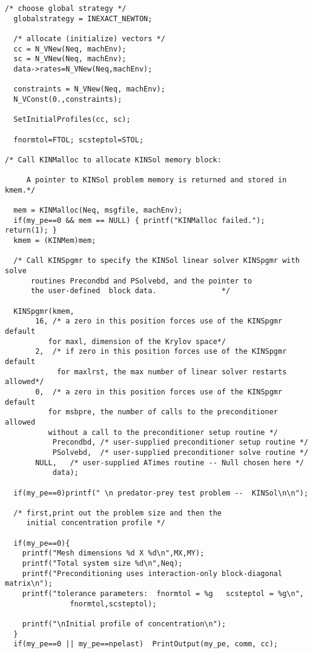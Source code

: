 \begin{verbatim}
/* choose global strategy */
  globalstrategy = INEXACT_NEWTON;

  /* allocate (initialize) vectors */
  cc = N_VNew(Neq, machEnv);
  sc = N_VNew(Neq, machEnv);
  data->rates=N_VNew(Neq,machEnv);

  constraints = N_VNew(Neq, machEnv);
  N_VConst(0.,constraints);
  
  SetInitialProfiles(cc, sc);

  fnormtol=FTOL; scsteptol=STOL;

/* Call KINMalloc to allocate KINSol memory block: 

     A pointer to KINSol problem memory is returned and stored in kmem.*/

  mem = KINMalloc(Neq, msgfile, machEnv);
  if(my_pe==0 && mem == NULL) { printf("KINMalloc failed."); return(1); }
  kmem = (KINMem)mem;

  /* Call KINSpgmr to specify the KINSol linear solver KINSpgmr with solve 
      routines Precondbd and PSolvebd, and the pointer to 
      the user-defined  block data.               */

  KINSpgmr(kmem,
	   16, /* a zero in this position forces use of the KINSpgmr default
		  for maxl, dimension of the Krylov space*/
	   2,  /* if zero in this position forces use of the KINSpgmr default
	        for maxlrst, the max number of linear solver restarts allowed*/
	   0,  /* a zero in this position forces use of the KINSpgmr default 
		  for msbpre, the number of calls to the preconditioner allowed
		  without a call to the preconditioner setup routine */
           Precondbd, /* user-supplied preconditioner setup routine */
           PSolvebd,  /* user-supplied preconditioner solve routine */
	   NULL,   /* user-supplied ATimes routine -- Null chosen here */
           data);

  if(my_pe==0)printf(" \n predator-prey test problem --  KINSol\n\n");

  /* first,print out the problem size and then the 
     initial concentration profile */

  if(my_pe==0){
    printf("Mesh dimensions %d X %d\n",MX,MY);
    printf("Total system size %d\n",Neq);
    printf("Preconditioning uses interaction-only block-diagonal matrix\n");
    printf("tolerance parameters:  fnormtol = %g   scsteptol = %g\n",
	           fnormtol,scsteptol);

    printf("\nInitial profile of concentration\n");
  }
  if(my_pe==0 || my_pe==npelast)  PrintOutput(my_pe, comm, cc);
  

\end{verbatim}
